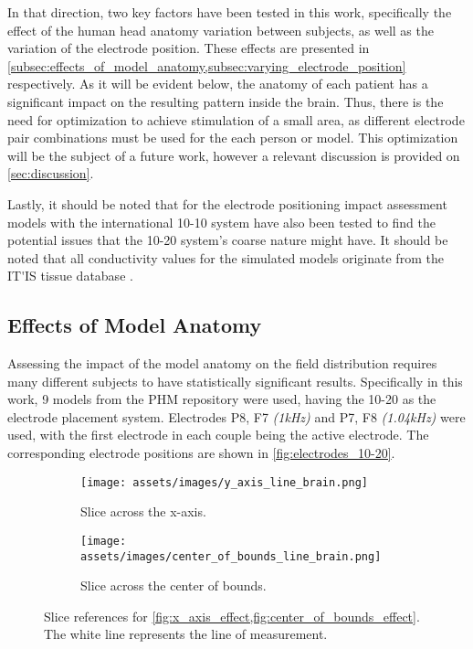 In that direction, two key factors have been tested in this work, specifically the effect of the human head anatomy variation between subjects, as well as the variation of the electrode position. These effects are presented in \cref{subsec:effects_of_model_anatomy,subsec:varying_electrode_position} respectively. As it will be evident below, the anatomy of each patient has a significant impact on the resulting pattern inside the brain. Thus, there is the need for optimization to achieve stimulation of a small area, as different electrode pair combinations must be used for the each person or model. This optimization will be the subject of a future work, however a relevant discussion is provided on \autoref{sec:discussion}.

Lastly, it should be noted that for the electrode positioning impact assessment models with the international 10-10 system have also been tested to find the potential issues that the 10-20 system's coarse nature might have. It should be noted that all conductivity values for the simulated models originate from the \gls{IT'IS} tissue database \cite{ITstissue}.

\subsection{Effects of Model Anatomy}
\label{subsec:effects_of_model_anatomy}

Assessing the impact of the model anatomy on the field distribution requires many different subjects to have statistically significant results. Specifically in this work, 9 models from the \gls{PHM} repository \cite{ErikG.Lee2016} were used, having the 10-20 as the electrode placement system. Electrodes P8, F7 \textit{(1\si{kHz})} and P7, F8 \textit{(1.04\si{kHz})} were used, with the first electrode in each couple being the active electrode. The corresponding electrode positions are shown in \autoref{fig:electrodes_10-20}.

\begin{figure}[H]
    \centering
    \begin{subfigure}[b]{0.49\textwidth}
        \texttt{[image: assets/images/y\_axis\_line\_brain.png]}
        \caption{Slice across the x-axis.}
        \label{fig:brain_slice_for_effects_x}
    \end{subfigure}
    \begin{subfigure}[b]{0.49\textwidth}
        \texttt{[image: assets/images/center\_of\_bounds\_line\_brain.png]}
        \caption{Slice across the center of bounds.}
        \label{fig:brain_slice_for_effects_cf}
    \end{subfigure}
    \caption{Slice references for \cref{fig:x_axis_effect,fig:center_of_bounds_effect}. The white line represents the line of measurement.}
    \label{fig:brain_slice_for_effects}
\end{figure}

